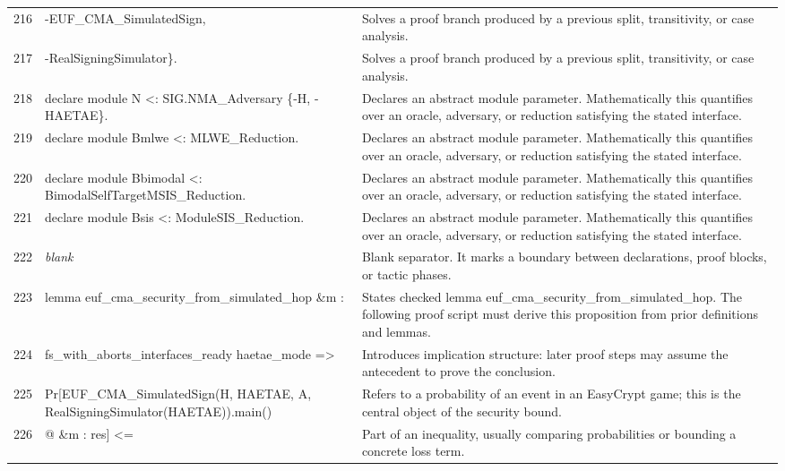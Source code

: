 \documentclass[10pt]{article}
\begin{document}
\begin{longtable}{r L{0.53\textwidth} L{0.37\textwidth}}
216 & {\ttfamily\scriptsize                                     -EUF\_CMA\_SimulatedSign,} & Solves a proof branch produced by a previous split, transitivity, or case analysis. \\
217 & {\ttfamily\scriptsize                                     -RealSigningSimulator\}.} & Solves a proof branch produced by a previous split, transitivity, or case analysis. \\
218 & {\ttfamily\scriptsize declare module N <: SIG.NMA\_Adversary \{-H, -HAETAE\}.} & Declares an abstract module parameter.  Mathematically this quantifies over an oracle, adversary, or reduction satisfying the stated interface. \\
219 & {\ttfamily\scriptsize declare module Bmlwe <: MLWE\_Reduction.} & Declares an abstract module parameter.  Mathematically this quantifies over an oracle, adversary, or reduction satisfying the stated interface. \\
220 & {\ttfamily\scriptsize declare module Bbimodal <: BimodalSelfTargetMSIS\_Reduction.} & Declares an abstract module parameter.  Mathematically this quantifies over an oracle, adversary, or reduction satisfying the stated interface. \\
221 & {\ttfamily\scriptsize declare module Bsis <: ModuleSIS\_Reduction.} & Declares an abstract module parameter.  Mathematically this quantifies over an oracle, adversary, or reduction satisfying the stated interface. \\
222 & {\ttfamily\scriptsize \emph{blank}} & Blank separator.  It marks a boundary between declarations, proof blocks, or tactic phases. \\
223 & {\ttfamily\scriptsize lemma euf\_cma\_security\_from\_simulated\_hop \&m :} & States checked lemma euf\_cma\_security\_from\_simulated\_hop.  The following proof script must derive this proposition from prior definitions and lemmas. \\
224 & {\ttfamily\scriptsize   fs\_with\_aborts\_interfaces\_ready haetae\_mode =>} & Introduces implication structure: later proof steps may assume the antecedent to prove the conclusion. \\
225 & {\ttfamily\scriptsize   Pr[EUF\_CMA\_SimulatedSign(H, HAETAE, A, RealSigningSimulator(HAETAE)).main()} & Refers to a probability of an event in an EasyCrypt game; this is the central object of the security bound. \\
226 & {\ttfamily\scriptsize        @ \&m : res] <=} & Part of an inequality, usually comparing probabilities or bounding a concrete loss term. \\

\end{longtable}
\end{document}
